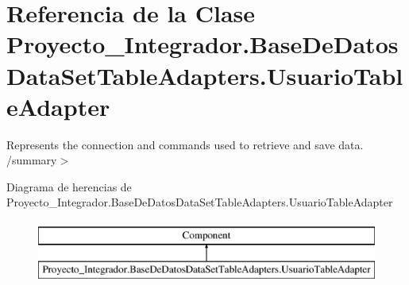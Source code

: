 \section{Referencia de la Clase Proyecto\-\_\-\-Integrador.\-Base\-De\-Datos\-Data\-Set\-Table\-Adapters.\-Usuario\-Table\-Adapter}
\label{class_proyecto___integrador_1_1_base_de_datos_data_set_table_adapters_1_1_usuario_table_adapter}


Represents the connection and commands used to retrieve and save data. /summary$>$  


Diagrama de herencias de Proyecto\-\_\-\-Integrador.\-Base\-De\-Datos\-Data\-Set\-Table\-Adapters.\-Usuario\-Table\-Adapter\begin{figure}[H]
\begin{center}
\leavevmode
\includegraphics[height=2.000000cm]{class_proyecto___integrador_1_1_base_de_datos_data_set_table_adapters_1_1_usuario_table_adapter}
\end{center}
\end{figure}

